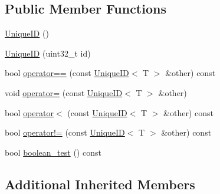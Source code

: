 \subsection*{Public Member Functions}
\begin{DoxyCompactItemize}
\item 
\hyperlink{class_unique_i_d_a5059b5e246a73e9ec1a9e84a8a06b057}{Unique\-I\-D} ()
\item 
\hyperlink{class_unique_i_d_a8d198137750453976873621964e33f70}{Unique\-I\-D} (uint32\-\_\-t id)
\item 
bool \hyperlink{class_unique_i_d_aabd2bd1de5fe5fcd819605975b4581e7}{operator==} (const \hyperlink{class_unique_i_d}{Unique\-I\-D}$<$ T $>$ \&other) const 
\item 
void \hyperlink{class_unique_i_d_a4f57b6539f3fd955e9eda344b1bc6a79}{operator=} (const \hyperlink{class_unique_i_d}{Unique\-I\-D}$<$ T $>$ \&other)
\item 
bool \hyperlink{class_unique_i_d_ac35bf39e46a1f1dffaac6ce25749dfd7}{operator$<$} (const \hyperlink{class_unique_i_d}{Unique\-I\-D}$<$ T $>$ \&other) const 
\item 
bool \hyperlink{class_unique_i_d_a6f6dcd169181355a7562eb226d356e4e}{operator!=} (const \hyperlink{class_unique_i_d}{Unique\-I\-D}$<$ T $>$ \&other) const 
\item 
bool \hyperlink{class_unique_i_d_a4cff40c83caafd67f199325a0f4da670}{boolean\-\_\-test} () const 
\end{DoxyCompactItemize}
\subsection*{Additional Inherited Members}


